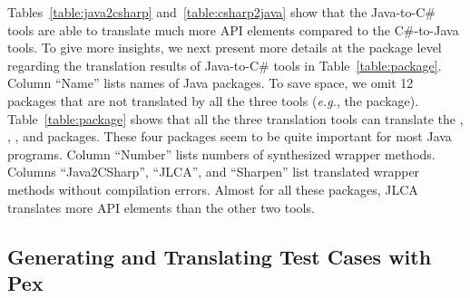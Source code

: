 Tables~\ref{table:java2csharp} and~\ref{table:csharp2java} show that the Java-to-C\# tools are able to translate much more API elements compared to the C\#-to-Java tools. To give more insights, we next present more details at the package level regarding the translation results of Java-to-C\# tools in Table~\ref{table:package}. Column ``Name'' lists names of Java packages. To save space, we omit 12 packages that are not translated by all the three tools (\emph{e.g.}, the  package). Table~\ref{table:package} shows that all the three translation tools can translate the , , , and  packages. These four packages seem to be quite important for most Java programs. Column ``Number'' lists numbers of synthesized wrapper methods. Columns ``Java2CSharp'', ``JLCA'', and ``Sharpen'' list translated wrapper methods without compilation errors. Almost for all these packages, JLCA translates more API elements than the other two tools.


\subsection{Generating and Translating Test Cases with Pex}
\label{sec:evaluation:single}

